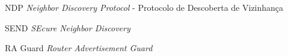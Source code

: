 \begin{siglas}
	\item[NDP]      \textit{Neighbor Discovery Protocol} - Protocolo de Descoberta de Vizinhança\footnotemark[1]
	\item[SEND]     \textit{SEcure Neighbor Discovery} 
	\item[RA Guard] \textit{Router Advertisement Guard}
	\item[]      \textit{}
\item[]      \textit{}
\item[]      \textit{}
\item[]      \textit{}
\item[]      \textit{}
	
\end{siglas}


